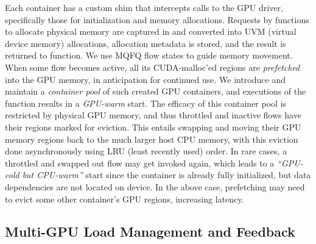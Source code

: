 Each container has a custom shim that intercepts calls to the GPU driver, specifically those for initialization and memory allocations.
Requests by functions to allocate physical memory are captured in and converted into UVM (virtual device memory) allocations, allocation metadata is stored, and the result is returned to function.
We use MQFQ flow states to guide memory movement.
When some flow becomes active, all its CUDA-malloc'ed regions are \emph{prefetched} into the GPU memory, in anticipation for continued use.
We introduce and maintain a \emph{container pool} of such created GPU containers, and executions of the function results in a \emph{GPU-warm} start.
The efficacy of this container pool is restricted by physical GPU memory, and thus throttled and inactive flows have their regions marked for eviction.
This entails swapping and moving their GPU memory regions back to the much larger host CPU memory, with this eviction done asynchronously using LRU (least recently used) order.
In rare cases, a throttled and swapped out flow may get invoked again, which leads to a \emph{``GPU-cold but CPU-warm''} start since the container is already fully initialized, but data dependencies are not located on device. 
In the above case, prefetching may need to evict some other container's GPU regions, increasing latency. 


\subsection{Multi-GPU Load Management and Feedback}
\label{sec:gpu-man}


